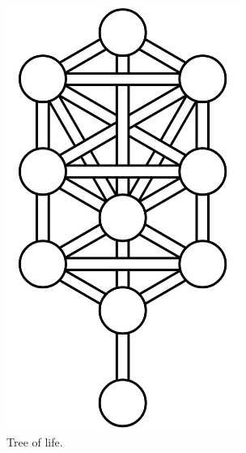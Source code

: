 \documentclass{report}
\begin{document}
\begin{figure}
	\centering
	\includegraphics[width=3in]{imageserver/uploadimages/image1.png}
	\caption{Tree of life.}
\end{figure}
\end{document}
